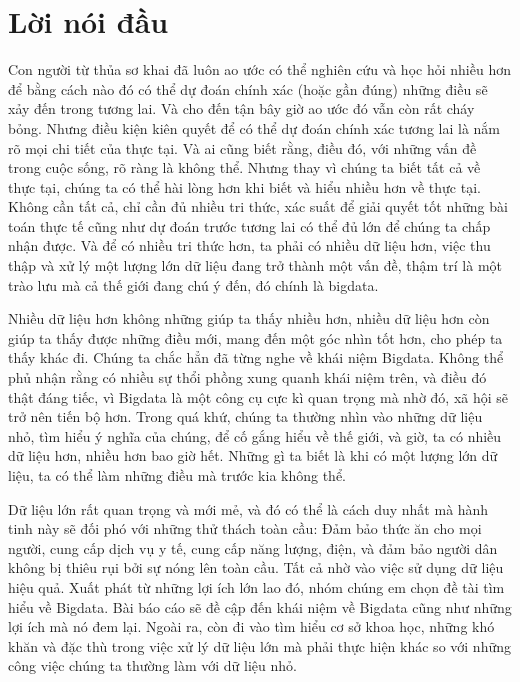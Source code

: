 \documentclass[12pt]{report}
\begin{document}

\newpage
\setcounter{page}{1}
\tableofcontents
\newpage
\chapter*{Lời nói đầu}
Con người từ thủa sơ khai đã luôn ao ước có thể nghiên cứu và học hỏi nhiều hơn để bằng cách nào đó có thể dự đoán chính xác (hoặc gần đúng) những điều sẽ xảy đến trong tương lai. Và cho đến tận bây giờ ao ước đó vẫn còn rất cháy bỏng. Nhưng điều kiện kiên quyết để có thể dự đoán chính xác tương lai là nắm rõ mọi chi tiết của thực tại. Và ai cũng biết rằng, điều đó, với những vấn đề trong cuộc sống, rõ ràng là không thể. Nhưng thay vì chúng ta biết tất cả về thực tại, chúng ta có thể hài lòng hơn khi biết và hiểu nhiều hơn về thực tại. Không cần tất cả, chỉ cần đủ nhiều tri thức, xác suất để giải quyết tốt những bài toán thực tế cũng như dự đoán trước tương lai có thể đủ lớn để chúng ta chấp nhận được. Và để có nhiều tri thức hơn, ta phải có nhiều dữ liệu hơn, việc thu thập và xử lý một lượng lớn dữ liệu đang trở thành một vấn đề, thậm trí là một trào lưu mà cả thế giới đang chú ý đến, đó chính là bigdata. 

Nhiều dữ liệu hơn không những giúp ta thấy nhiều hơn, nhiều dữ liệu hơn còn giúp ta thấy được những điều mới, mang đến một góc nhìn tốt hơn, cho phép ta thấy khác đi. Chúng ta chắc hẳn đã từng nghe về khái niệm Bigdata. Không thể phủ nhận rằng có nhiều sự thổi phồng xung quanh khái niệm trên, và điều đó thật đáng tiếc, vì Bigdata là một công cụ cực kì quan trọng mà nhờ đó, xã hội sẽ trở nên tiến bộ hơn. Trong quá khứ, chúng ta thường nhìn vào những dữ liệu nhỏ, tìm hiểu ý nghĩa của chúng, để cố gắng hiểu về thế giới, và giờ, ta có nhiều dữ liệu hơn, nhiều hơn bao giờ hết. Những gì ta biết là khi có một lượng lớn dữ liệu, ta có thể làm những điều mà trước kia không thể. 

Dữ liệu lớn rất quan trọng và mới mẻ, và đó có thể là cách duy nhất mà hành tinh này sẽ đối phó với những thử thách toàn cầu: Đảm bảo thức ăn cho mọi người, cung cấp dịch vụ y tế, cung cấp năng lượng, điện, và đảm bảo người dân không bị thiêu rụi bởi sự nóng lên toàn cầu. Tất cả nhờ vào việc sử dụng dữ liệu hiệu quả. Xuất phát từ những lợi ích lớn lao đó, nhóm chúng em chọn đề tài tìm hiểu về Bigdata.
Bài báo cáo sẽ đề cập đến khái niệm về Bigdata cũng như những lợi ích mà nó đem lại. Ngoài ra, còn đi vào tìm hiểu cơ sở khoa học, những khó khăn và đặc thù trong việc xử lý dữ liệu lớn mà phải thực hiện khác so với những công việc chúng ta thường làm với dữ liệu nhỏ.
\end{document}
